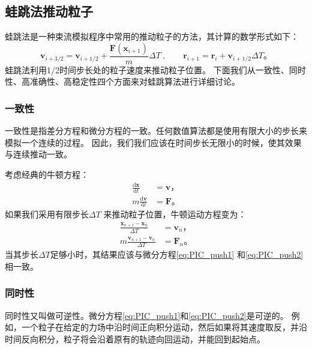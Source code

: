 {\subsection{蛙跳法推动粒子}
蛙跳法是一种束流模拟程序中常用的推动粒子的方法\cite{birdsall2004plasma}，其计算的数学形式如下：
\begin{equation}
  \label{eq:leapfrog}
  \mathbf{v}_{i+3/2} = \mathbf{v}_{i+1/2} + \frac{\mathbf{F}(\mathbf{x}_{i+1})}{m} {\Delta T}
  ~, \qquad
  \mathbf{r}_{i+1}   = \mathbf{r}_{i}     + \mathbf{v}_{i+1/2} {\Delta T} \text{。}
\end{equation}
蛙跳法利用1/2时间步长处的粒子速度来推动粒子位置。
下面我们从一致性、同时性、高准确性、高稳定性四个方面来对蛙跳算法进行详细讨论。

\subsubsection{一致性}
      一致性是指差分方程和微分方程的一致。任何数值算法都是使用有限大小的步长来模拟一个连续的过程。
      因此，我们我们应该在时间步长无限小的时候，使其效果与连续推动一致。

      考虑经典的牛顿方程：
      \begin{align}
        \label{eq:PIC_push1}
         \frac{\mathrm{d} \mathbf{x}}{\mathrm{d} t} &= \mathbf{v} \text{，} \\
        \label{eq:PIC_push2}
        m\frac{\mathrm{d} \mathbf{v}}{\mathrm{d} t} &= \mathbf{F} \text{。}
      \end{align}
      如果我们采用有限步长$\Delta T$ 来推动粒子位置，牛顿运动方程变为：
      \begin{align}
         \label{eq:PIC_push3}
         \frac{\mathbf{x}_{n+1}-\mathbf{x}_n}{\Delta T} &= \mathbf{v}_n \text{，} \\
         \label{eq:PIC_push4}
        m\frac{\mathbf{v}_{n+1}-\mathbf{v}_n}{\Delta T} &= \mathbf{F}_n \text{。}
      \end{align}
      当其步长$\Delta T$足够小时，其结果应该与微分方程\eqref{eq:PIC_push1} 和\eqref{eq:PIC_push2}相一致。
\subsubsection{同时性}
      同时性又叫做可逆性。微分方程\eqref{eq:PIC_push1}和\eqref{eq:PIC_push2}是可逆的。
      例如，一个粒子在给定的力场中沿时间正向积分运动，然后如果将其速度取反，并沿时间反向积分，粒子将会沿着原有的轨迹向回运动，并能回到起始点。

}
